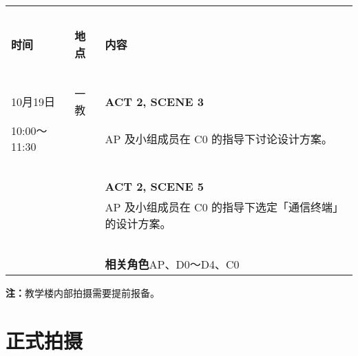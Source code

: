\documentclass[10pt, a5paper, oneside]{memoir}
\begin{document}
\begin{table}[!ht]
    \raggedright
    \begin{tabular}{p{}p{}p{}}
        \toprule
        ~ & & \\[-0.7em]
        \textbf{时间} & \textbf{地点} & \textbf{内容} \\[0.3em]
        \midrule
        ~ & & \\[-0.7em]
        10月19日        & 一教 & \textbf{ACT 2, SCENE 3} \\[0.3em]
        10:00～11:30     & ~ & 
            AP 及小组成员在 C0 的指导下讨论设计方案。 
        \\
        ~ & & \\[-0.7em]
        ~ & ~ & \textbf{ACT 2, SCENE 5} \\[0.3em]
        ~ & ~ & 
            AP 及小组成员在 C0 的指导下选定「通信终端」的设计方案。 
        \\
        ~ & & \\[-0.7em]
        ~ & ~ & \textbf{相关角色\quad}AP、D0～D4、C0 \\[0.3em]
        \bottomrule
    \end{tabular}
\end{table}
{   \vspace{-0.7\baselineskip}
    \kai \small
    \textbf{注：}教学楼内部拍摄需要提前报备。
}

\clearpage

\section*{正式拍摄}
\end{document}
